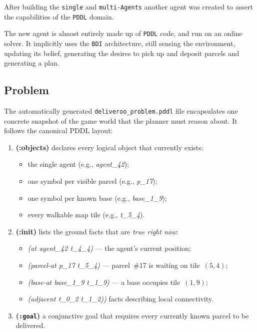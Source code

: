 After building the \texttt{single} and \texttt{multi-Agents} another agent was created to assert the capabilities of the \texttt{PDDL} domain.

The new agent is almost entirely made up of \texttt{PDDL} code, and run on an online solver. It implicitly uses the \texttt{BDI} architecture, still sensing the environment, updating its belief, generating the desires to pick up and deposit parcels and generating a plan.

\subsection{Problem}

The automatically generated \texttt{deliveroo\_problem.pddl} file encapsulates one concrete snapshot of the game world that the planner must reason about. It follows the canonical PDDL layout:

\begin{enumerate}
  \item \textbf{(:objects)} declares every logical object that currently exists:
    \begin{itemize}
      \item the single agent (e.g., \textit{agent\_42});
      \item one symbol per visible parcel (e.g., \textit{p\_17});
      \item one symbol per known base (e.g., \textit{base\_1\_9});
      \item every walkable map tile (e.g., \textit{t\_5\_4}).
    \end{itemize}

  \item \textbf{(:init)} lists the ground facts that are \emph{true right now}:
    \begin{itemize}
      \item \textit{(at agent\_42 t\_4\_4)} — the agent’s current position;
      \item \textit{(parcel-at p\_17 t\_5\_4)} — parcel~\#17 is waiting on tile~$(5,4)$;
      \item \textit{(base-at base\_1\_9 t\_1\_9)} — a base occupies tile~$(1,9)$;
      \item \textit{ (adjacent t\_0\_2 t\_1\_2))} facts describing local connectivity.
    \end{itemize}

  \item \textbf{(\texttt{:goal})} a conjunctive goal that requires every currently known parcel to be delivered.

\end{enumerate}

